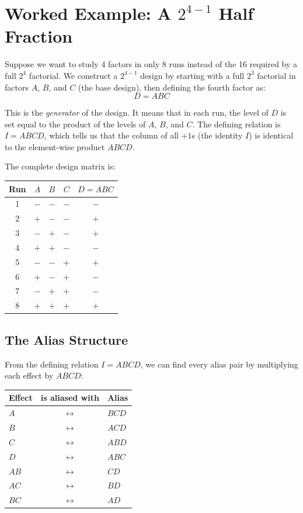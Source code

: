 \documentclass[11pt]{book}
\begin{document}
\section{Worked Example: A $2^{4-1}$ Half Fraction}

Suppose we want to study 4 factors in only 8 runs instead of the 16 required by
a full $2^4$ factorial. We construct a $2^{4-1}$ design by starting with a full
$2^3$ factorial in factors $A$, $B$, and $C$ (the base design), then defining
the fourth factor as:
\[
D = ABC
\]

This is the \emph{generator} of the design. It means that in each run, the
level of $D$ is set equal to the product of the levels of $A$, $B$, and $C$.
The defining relation is $I = ABCD$, which tells us that the column of all
$+1$s (the identity $I$) is identical to the element-wise product $ABCD$.

The complete design matrix is:

\begin{center}
\begin{tabular}{ccccc}
\toprule
Run & $A$ & $B$ & $C$ & $D = ABC$ \\
\midrule
1 & $-$ & $-$ & $-$ & $-$ \\
2 & $+$ & $-$ & $-$ & $+$ \\
3 & $-$ & $+$ & $-$ & $+$ \\
4 & $+$ & $+$ & $-$ & $-$ \\
5 & $-$ & $-$ & $+$ & $+$ \\
6 & $+$ & $-$ & $+$ & $-$ \\
7 & $-$ & $+$ & $+$ & $-$ \\
8 & $+$ & $+$ & $+$ & $+$ \\
\bottomrule
\end{tabular}
\end{center}

\subsection{The Alias Structure}

From the defining relation $I = ABCD$, we can find every alias pair by
multiplying each effect by $ABCD$:

\begin{center}
\begin{tabular}{lcl}
\toprule
Effect & is aliased with & Alias \\
\midrule
$A$ & $\leftrightarrow$ & $BCD$ \\
$B$ & $\leftrightarrow$ & $ACD$ \\
$C$ & $\leftrightarrow$ & $ABD$ \\
$D$ & $\leftrightarrow$ & $ABC$ \\
$AB$ & $\leftrightarrow$ & $CD$ \\
$AC$ & $\leftrightarrow$ & $BD$ \\
$BC$ & $\leftrightarrow$ & $AD$ \\
\bottomrule
\end{tabular}
\end{center}
\end{document}
